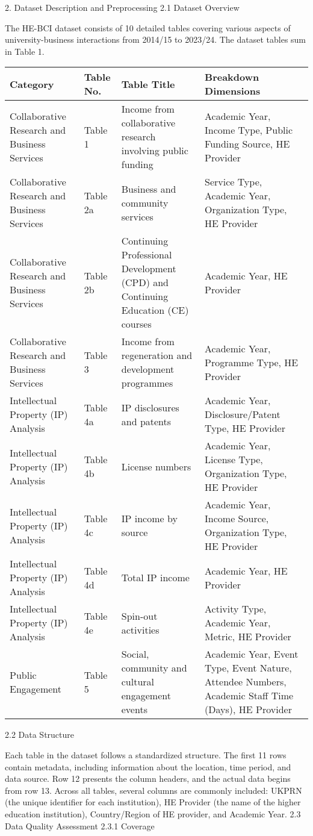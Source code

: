 2. Dataset Description and Preprocessing
2.1 Dataset Overview

The HE-BCI dataset consists of 10 detailed tables covering various aspects of university-business interactions from 2014/15 to 2023/24. The dataset tables sum in Table 1.
\begin{tabular}{|l|l|l|l|}
    \hline Category & Table No. & Table Title & Breakdown Dimensions \\
    \hline Collaborative Research and Business Services & Table 1 & Income from collaborative research involving public funding & Academic Year, Income Type, Public Funding Source, HE Provider \\
    \hline Collaborative Research and Business Services & Table 2a & Business and community services & Service Type, Academic Year, Organization Type, HE Provider \\
    \hline Collaborative Research and Business Services & Table 2b & Continuing Professional Development (CPD) and Continuing Education (CE) courses & Academic Year, HE Provider \\
    \hline Collaborative Research and Business Services & Table 3 & Income from regeneration and development programmes & Academic Year, Programme Type, HE Provider \\
    \hline Intellectual Property (IP) Analysis & Table 4a & IP disclosures and patents & Academic Year, Disclosure/Patent Type, HE Provider \\
    \hline Intellectual Property (IP) Analysis & Table 4b & License numbers & Academic Year, License Type, Organization Type, HE Provider \\
    \hline Intellectual Property (IP) Analysis & Table 4c & IP income by source & Academic Year, Income Source, Organization Type, HE Provider \\
    \hline Intellectual Property (IP) Analysis & Table 4d & Total IP income & Academic Year, HE Provider \\
    \hline Intellectual Property (IP) Analysis & Table 4e & Spin-out activities & Activity Type, Academic Year, Metric, HE Provider \\
    \hline Public Engagement & Table 5 & Social, community and cultural engagement events & Academic Year, Event Type, Event Nature, Attendee Numbers, Academic Staff Time (Days), HE Provider \\
    \hline
\end{tabular}

2.2 Data Structure

Each table in the dataset follows a standardized structure. The first 11 rows contain metadata, including information about the location, time period, and data source. Row 12 presents the column headers, and the actual data begins from row 13. Across all tables, several columns are commonly included: UKPRN (the unique identifier for each institution), HE Provider (the name of the higher education institution), Country/Region of HE provider, and Academic Year.
2.3 Data Quality Assessment
2.3.1 Coverage

